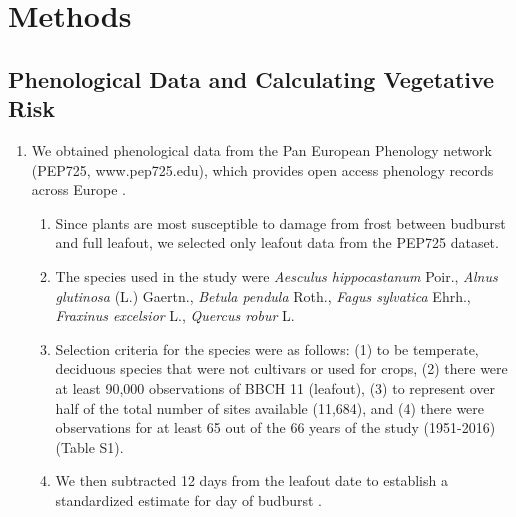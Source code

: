 \documentclass{article}\usepackage[]{graphicx}\usepackage[]{color}
\begin{document}
\section*{Methods}
\subsection*{Phenological Data and Calculating Vegetative Risk}
\begin{enumerate}
\item We obtained phenological data from the Pan European Phenology network (PEP725, www.pep725.edu), which provides open access phenology records across Europe \citep{Templ2018}.
  \begin{enumerate}
\item Since plants are most susceptible to damage from frost between budburst and full leafout, we selected only leafout data \citep[i.e., in][BBCH 11, which is defined as the point of leaf unfolding and the first visible leaf stalk]{Meier2001} from the PEP725 dataset.
\item The species used in the study were \textit{Aesculus hippocastanum} Poir., \textit{Alnus glutinosa} (L.) Gaertn., \textit{Betula pendula} Roth., \textit{Fagus sylvatica} Ehrh., \textit{Fraxinus excelsior} L., \textit{Quercus robur} L.
\item Selection criteria for the species were as follows: (1) to be temperate, deciduous species that were not cultivars or used for crops, (2) there were at least 90,000 observations of BBCH 11 (leafout), (3) to represent over half of the total number of sites available (11,684), and (4) there were observations for at least 65 out of the 66 years of the study (1951-2016) (Table S1). %
\item We then subtracted 12 days from the leafout date to establish a standardized estimate for day of budburst \citep{Donnelly2017}. 
  \end{enumerate}
\end{enumerate}
\end{document}
